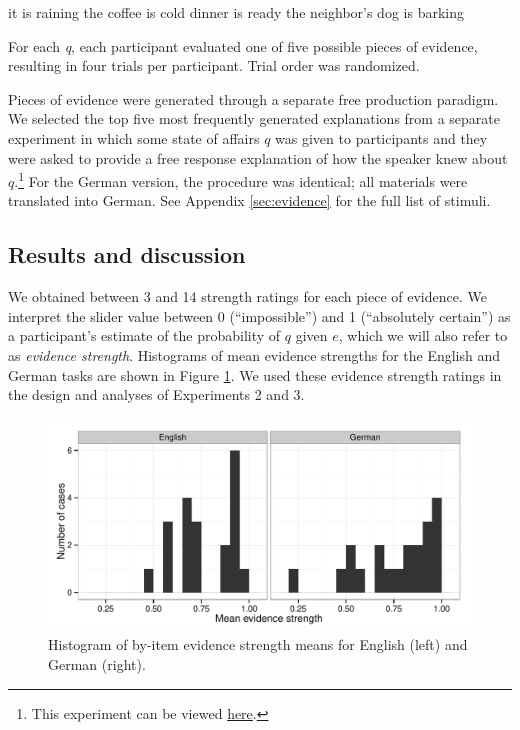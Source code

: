 \documentclass[11pt]{article}
\newcommand{\figref}[1]{Figure \ref{#1}}
\newcommand{\appref}[1]{Appendix \ref{#1}}
\begin{document}
\begin{exe}
\ex
\begin{xlist}
	\ex it is raining
	\ex the coffee is cold
	\ex dinner is ready
	\ex the neighbor's dog is barking
	\end{xlist}
\end{exe}

For each \emph{q}, each participant evaluated one of five possible pieces of evidence, resulting in four trials per participant. Trial order was randomized. 

Pieces of evidence were generated through a separate free production paradigm. We selected the top five most frequently generated explanations from a separate experiment in which some state of affairs $q$ was given to participants and they were asked to provide a free response explanation of how the speaker knew about $q$.\footnote{This experiment can be viewed \href{http://stanford.edu/~jdegen/68_modals_freeproduction/modals.html}{here}.} %
For the German version, the procedure was identical; all materials were translated into German. See \appref{sec:evidence} for the full list of stimuli.

\subsection{Results and discussion}

We obtained between 3 and 14 strength ratings for each piece of evidence. We interpret the slider value between 0 (``impossible'') and 1 (``absolutely certain'') as a participant's estimate of the probability of $q$ given $e$, which we will also refer to as  \emph{evidence strength}. Histograms of mean evidence strengths for the English and German tasks are shown in \figref{fig:evidencestrength}.  We used these evidence strength ratings in the design and analyses of Experiments 2 and 3.

\begin{figure}
\centering
\includegraphics[width=.9\textwidth]{pics/evidencestrength-histograms}
\caption{Histogram of by-item evidence strength means  for English (left) and German (right).}
\label{fig:evidencestrength}
\end{figure}
\end{document}
